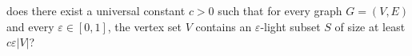 does there exist a universal constant $c > 0$ such that for every graph $G = (V,E)$ and every $\varepsilon \in [0,1]$, the vertex set $V$ contains an $\varepsilon$-light subset $S$ of size at least $c\varepsilon|V|$?